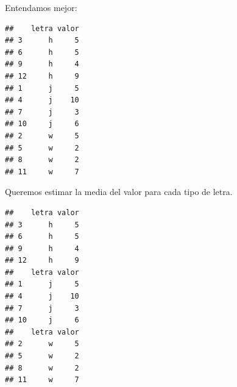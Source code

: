 \documentclass[]{article}
\newenvironment{Shaded}{\begin{snugshade}}{\end{snugshade}}
\newcommand{\KeywordTok}[1]{\textcolor[rgb]{0.13,0.29,0.53}{\textbf{{#1}}}}
\newcommand{\DataTypeTok}[1]{\textcolor[rgb]{0.13,0.29,0.53}{{#1}}}
\newcommand{\DecValTok}[1]{\textcolor[rgb]{0.00,0.00,0.81}{{#1}}}
\newcommand{\StringTok}[1]{\textcolor[rgb]{0.31,0.60,0.02}{{#1}}}
\newcommand{\CommentTok}[1]{\textcolor[rgb]{0.56,0.35,0.01}{\textit{{#1}}}}
\newcommand{\NormalTok}[1]{{#1}}
\begin{document}
Entendamos mejor:

\begin{Shaded}
\end{Shaded}

\begin{verbatim}
##    letra valor
## 3      h     5
## 6      h     5
## 9      h     4
## 12     h     9
## 1      j     5
## 4      j    10
## 7      j     3
## 10     j     6
## 2      w     5
## 5      w     2
## 8      w     2
## 11     w     7
\end{verbatim}

Queremos estimar la media del valor para cada tipo de letra.

\begin{Shaded}
\end{Shaded}

\begin{verbatim}
##    letra valor
## 3      h     5
## 6      h     5
## 9      h     4
## 12     h     9
##    letra valor
## 1      j     5
## 4      j    10
## 7      j     3
## 10     j     6
##    letra valor
## 2      w     5
## 5      w     2
## 8      w     2
## 11     w     7
\end{verbatim}

\begin{Shaded}
\end{Shaded}
\end{document}
